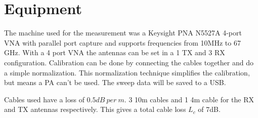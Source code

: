 %
%
%



\section{Equipment}
The machine used for the measurement was a Keysight PNA N5527A 4-port VNA with parallel port capture and supports frequencies from 10MHz to 67 GHz. With a 4 port VNA the antennas can be set in a 1 TX and 3 RX configuration. Calibration can be done by connecting the cables together and do a simple normalization. This normalization technique simplifies the calibration, but means a \gls{PA} can't be used.  The sweep data will be saved to a USB.

Cables used have a loss of $0.5dB  \ per \ m$. 3 10m cables and 1 4m cable for the RX and TX antennas respectively. This gives a total cable loss $L_c$ of 7dB.

